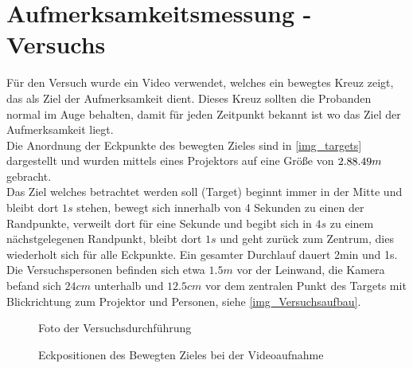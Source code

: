 \section{Aufmerksamkeitsmessung - Versuchs}
\label{VideoAnalyse}
Für den Versuch wurde ein Video verwendet, welches ein bewegtes Kreuz zeigt, das als Ziel der Aufmerksamkeit dient. Dieses Kreuz sollten die Probanden normal im Auge behalten, damit für jeden Zeitpunkt bekannt ist wo das Ziel der Aufmerksamkeit liegt.\\
Die Anordnung der Eckpunkte des bewegten Zieles sind in \autoref{img_targets} dargestellt und wurden mittels eines Projektors auf eine Größe von $2.88 \time 1.49 m$ gebracht.\\
Das Ziel welches betrachtet werden soll (Target) beginnt immer in der Mitte und bleibt dort $1s$ stehen, bewegt sich innerhalb von 4 Sekunden zu einen der Randpunkte, verweilt dort für eine Sekunde und begibt sich in $4s$ zu einem nächstgelegenen Randpunkt, bleibt dort $1s$ und geht zurück zum Zentrum, dies wiederholt sich für alle Eckpunkte. Ein gesamter Durchlauf dauert 2min und 1s.\\
Die Versuchspersonen befinden sich etwa $1.5m$ vor der Leinwand, die Kamera befand sich $24cm$ unterhalb und $12.5cm$ vor dem zentralen Punkt des Targets mit Blickrichtung zum Projektor und Personen, siehe \autoref{img_Versuchsaufbau}.
\begin{figure}
	\centering
	\caption{Foto der Versuchsdurchführung}
	\label{img_Versuchsaufbau}
\end{figure}
\begin{figure}
\centering
{}
\caption{Eckpositionen des Bewegten Zieles bei der Videoaufnahme}
\label{img_targets}
\end{figure}
